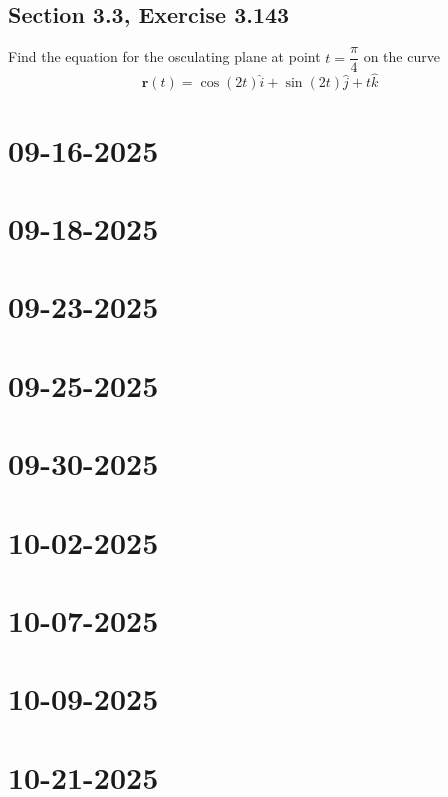 \documentclass[]{mangos-musings}
\begin{document}
\subsection{Section 3.3, Exercise 3.143}
Find the equation for the osculating plane at point $t = \dfrac{\pi}{4}$ on the curve 
\[\mathbf{r}(t) = \cos(2t) \hat{i} + \sin(2t)\hat{j} + t\hat{k}\]

\newpage
\section{09-16-2025}

\newpage
\section{09-18-2025}

\newpage
\section{09-23-2025}

\newpage
\section{09-25-2025}

\newpage
\section{09-30-2025}

\newpage
\section{10-02-2025}

\newpage
\section{10-07-2025}

\newpage
\section{10-09-2025}

\newpage
\section{10-21-2025}

\newpage
\end{document}
